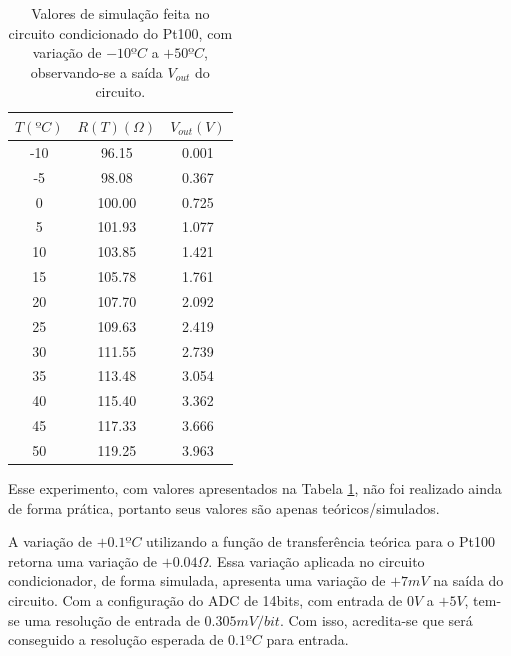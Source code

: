 \documentclass[a4paper]{instrumentacao}
\begin{document}
\begin{table}[H]
\centering
\caption{Valores de simulação feita no circuito condicionado do Pt100, com variação de $-10ºC$ a $+50ºC$, observando-se a saída $V_{out}$ do circuito.}
\label{tab:pt100-simulacao-ckt-condicionador}
\begin{tabular}{|c|c|c|}
\hline
\textbf{$T (ºC)$} & \textbf{$R(T)(\Omega)$} & \textbf{$V_{out} (V)$} \\ \hline
-10             & 96.15         & 0.001               \\ \hline
-5              & 98.08         & 0.367               \\ \hline
0               & 100.00        & 0.725               \\ \hline
5               & 101.93        & 1.077               \\ \hline
10              & 103.85        & 1.421               \\ \hline
15              & 105.78        & 1.761               \\ \hline
20              & 107.70        & 2.092               \\ \hline
25              & 109.63        & 2.419               \\ \hline
30              & 111.55        & 2.739               \\ \hline
35              & 113.48        & 3.054               \\ \hline
40              & 115.40        & 3.362               \\ \hline
45              & 117.33        & 3.666               \\ \hline
50              & 119.25        & 3.963               \\ \hline
\end{tabular}
\end{table}

Esse experimento, com valores apresentados na Tabela \ref{tab:pt100-simulacao-ckt-condicionador}, não foi realizado ainda de forma prática, portanto seus valores são apenas teóricos/simulados.

A variação de $+0.1ºC$ utilizando a função de transferência teórica para o Pt100 retorna uma variação de $+0.04\Omega$. Essa variação aplicada no circuito condicionador, de forma simulada, apresenta uma variação de $+7mV$ na saída do circuito. Com a configuração do ADC de 14bits, com entrada de $0V$ a $+5V$, tem-se uma resolução de entrada de $0.305mV/bit$. Com isso, acredita-se que será conseguido a resolução esperada de $0.1ºC$ para entrada.
\end{document}
